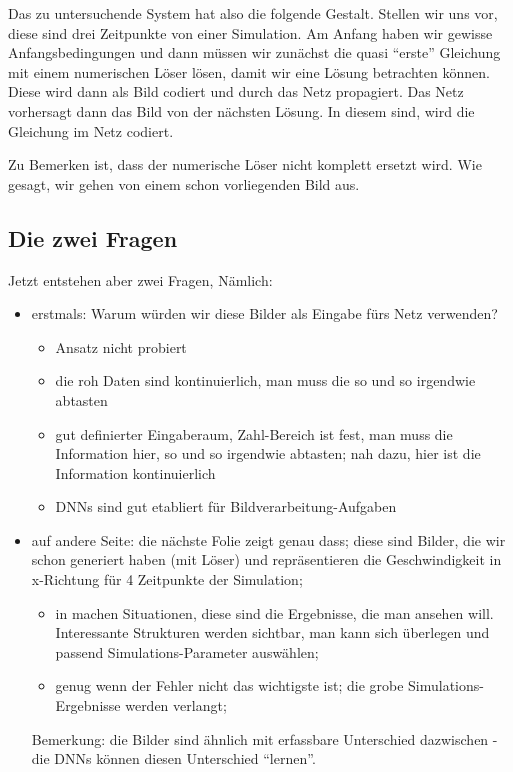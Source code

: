 \documentclass[margin=0.05in, tmargin=0.01in]{article}
\begin{document}
Das zu untersuchende System hat also die folgende Gestalt. Stellen wir uns vor, diese sind drei Zeitpunkte von einer Simulation. Am Anfang haben wir gewisse Anfangsbedingungen und dann müssen wir zunächst die  quasi ``erste'' Gleichung mit einem numerischen Löser lösen, damit wir eine Lösung betrachten können. Diese wird dann als Bild codiert und durch das Netz propagiert. Das Netz vorhersagt dann das Bild von der nächsten Lösung. In diesem sind, wird die Gleichung im Netz codiert.

Zu Bemerken ist, dass der numerische Löser nicht komplett ersetzt wird. Wie gesagt, wir gehen von einem schon vorliegenden Bild aus.


\subsection{Die zwei Fragen}
\label{sec:org08d5d74}
Jetzt entstehen aber zwei Fragen, Nämlich:

\begin{itemize}
\item erstmals: Warum würden wir diese Bilder als Eingabe fürs Netz verwenden?
\begin{itemize}
\item Ansatz nicht probiert
\item die roh Daten sind kontinuierlich, man muss die so und so irgendwie abtasten
\item gut definierter Eingaberaum, Zahl-Bereich ist fest, man muss die Information hier, so und so irgendwie abtasten; nah dazu, hier ist die Information kontinuierlich
\item DNNs sind gut etabliert für Bildverarbeitung-Aufgaben
\end{itemize}
\item auf andere Seite: die nächste Folie zeigt genau dass; diese sind Bilder, die wir schon generiert haben (mit Löser) und repräsentieren die Geschwindigkeit in x-Richtung für 4 Zeitpunkte der Simulation;
\begin{itemize}
\item in machen Situationen, diese sind die Ergebnisse, die man ansehen will. Interessante Strukturen werden sichtbar, man kann sich überlegen und passend Simulations-Parameter auswählen;
\item genug wenn der Fehler nicht das wichtigste ist; die grobe Simulations-Ergebnisse werden verlangt;
\end{itemize}

Bemerkung: die Bilder sind ähnlich mit erfassbare Unterschied dazwischen - die DNNs können diesen Unterschied ``lernen''.
\end{itemize}
\end{document}
